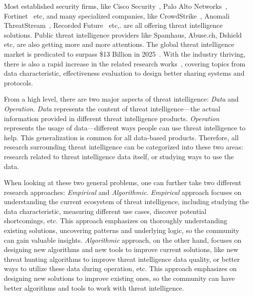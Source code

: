Most established security firms, like Cisco Security~\cite{ciscotalos}, 
Palo Alto Networks~\cite{panautofocus}, Fortinet~\cite{fortinet} etc, 
and many specialized companies, like CrowdStrike~\cite{crowdstrike}, 
Anomali ThreatStream~\cite{anomali}, Recorded Future~\cite{recordedfuture}
etc,. are all offering threat intelligence solutions. Public threat
intelligence providers like Spamhaus, Abuse.ch, Dshield etc, are also 
getting more and more attentions. The global threat intelligence market is
predicated to surpass \$13 Billion in 2025~\cite{tipredict2018}. With the
industry thriving, there is also a rapid increase in the related research
works~\cite{tounsi2018survey}, covering topics from data characteristic,
effectiveness evaluation to design better sharing systems and protocols.

From a high level, there are two major aspects of threat intelligence: 
\textit{Data} and \textit{Operation}. \textit{Data} represents the content 
of threat intelligence---the actual information provided in different threat
intelligence products. \textit{Operation} represents the usage of 
data---different ways people can use threat intelligence to help. This
generalization is common for all data-based products. Therefore,
all research surrounding threat intelligence can be categorized into
these two areas: research related to threat intelligence data itself, or 
studying ways to use the data.

When looking at these two general problems, one can further 
take two different research approaches: \textit{Empirical} and 
\textit{Algorithmic}. \textit{Empirical} approach focuses on understanding
the current ecosystem of threat intelligence, including studying the 
data characteristic, measuring different use cases, discover potential 
shortcomings, etc. This approach emphasizes on thoroughly understanding
existing solutions, uncovering patterns and underlying logic, 
so the community can gain valuable insights.
\textit{Algorithmic} approach, on the other hand, 
focuses on designing new algorithms and new tools to 
improve current solutions, like new threat hunting algorithms to improve 
threat intelligence data quality, or better ways to utilize these data 
during operation, etc. This approach emphasizes on designing new solutions 
to improve existing ones, so the community can have better algorithms and
tools to work with threat intelligence.

